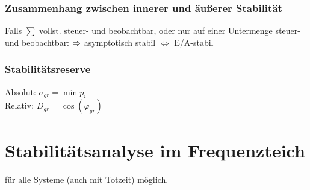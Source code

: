 \documentclass[fs, footer]{latex4ei}
\begin{document}
\begin{multicols*}{4}
{\subsubsection*{Zusammenhang zwischen innerer und äußerer Stabilität}
Falls $\sum$ vollst. steuer- und beobachtbar, oder nur auf einer Untermenge steuer- und beobachtbar:
$\Rightarrow$ asymptotisch stabil $\Leftrightarrow$ E/A-stabil\\

\subsubsection*{Stabilitätsreserve}
Absolut: $\sigma_{gr} = \min p_i$ \\

Relativ: $D_{gr} = \cos(\varphi_{gr})$

\vspace{1.14cm}
}

\columnbreak
\section{Stabilitätsanalyse im Frequenzteich}
für alle Systeme (auch mit Totzeit) möglich.



\end{multicols*}
\end{document}
